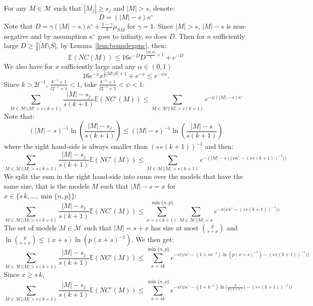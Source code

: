 \documentclass[aos]{imsart}
\theoremstyle{plain}
\newcommand{\E}{\mathbb{E}}
\begin{document}
\begin{supplement}
For any $M \in \mathcal{M}$ such that $|M_j| \geq s_j$ and $|M| > s$, denote:
$$D=\left(|M|-s\right)\kappa^{\circ}$$
Note that $D=\gamma\left(|M|-s\right)\kappa^{\circ} + \tfrac{1-\gamma}{8} \mu_{SM}$ for $\gamma=1$. Since $|M|> s$, $|M|-s$ is non-negative and by assumption $\kappa^{\circ}$ goes to infinity, so does $D$. Then for $n$ sufficiently large $D \geq \frac{3}{4}|M\setminus S|$, by Lemma~\ref{lem:boundexpnc}, then:
$$\E(N C(M)) \leq 16 e^{-D} D^{\frac{|M \setminus S|}{2}+1}+e^{-D}$$
We also have for $x$ sufficiently large and any $\alpha \in (0,1)$
\begin{equation}\label{eq:boundexp}
16e^{-x}x^{\tfrac12|M\setminus S|+1}+e^{-x}\leq e^{-\psi x}. 
\end{equation}
Since $k>2l^{-1}$, $\frac{k^{-1}+1}{l2^{-1}+1}<1$, take $\frac{k^{-1}+1}{l2^{-1}+1}< \psi <1 $:
$$\sum_{M \in \mathcal{M} ||M| > s(k+1)}\frac{|M|-s_j}{s(k+1)}\E(NC^{\circ}(M) ) \leq \sum_{M \in \mathcal{M} ||M| > s(k+1)}e^{-\psi \left(|M|-s\right)\kappa^{\circ}}$$
Note that:
$$\left(|M|-s\right)^{-1}\ln(\frac{|M|-s_j}{s(k+1)}) \leq \left(|M|-s\right)^{-1}\ln(\frac{|M|-s}{s(k+1)})$$
where the right hand-side is always smaller than $(s\,e(k+1))^{-1}$ and then:
$$\sum_{M \in \mathcal{M} ||M| > s(k+1)}\frac{|M|-s_j}{s(k+1)}\E(NC^{\circ}(M) ) \leq \sum_{M \in \mathcal{M} ||M| > s(k+1)}e^{-\left(|M|-s\right)\big(\psi \kappa^{\circ}-\left(s\,e(k+1)\right)^{-1})\big)}$$
We split the sum in the right hand-side into sums over the models that have the same size, that is the models $M$ such that $|M|-s= x$ for $x\in\{s\,k,\ldots,\min\{n,p\}\}$:
\begin{equation*}
    \sum_{M \in \mathcal{M} ||M| > s(k+1)}\frac{|M|-s_j}{s(k+1)}\E(NC^{\circ}(M) ) \leq \sum_{x=s(k+1)}^{\min\{n,p\}}\sum_{M \in \mathcal{M} ||M| =x }e^{-x\big(\psi\kappa^{\circ}-\left(s\,e(k+1)\right)^{-1})\big)}
\end{equation*}
The set of models $M \in \mathcal{M}$ such that $|M| =s+x$ has size at most $ {p \choose s+x}$ and $\ln{p \choose s+x}\leq (x+s) \ln(p(x+s)^{-1})$. We then get:
\begin{equation*}
    \sum_{M \in \mathcal{M} ||M| > s(k+1)}\frac{|M|-s_j}{s(k+1)}\E(NC^{\circ}(M) ) \leq \sum_{x=sk}^{\min\{n,p\}}e^{-x\big(\psi \kappa^{\circ}-(1+sx^{-1})\ln(p(x+s)^{-1})-\left(s\,e(k+1)\right)^{-1})\big)}
\end{equation*}
Since $x\geq s\,k$,
\begin{equation*}
\sum_{M \in \mathcal{M} ||M| > s(k+1)}\frac{|M|-
s_j}{s(k+1)}\E(NC^{\circ}(M) ) \leq \sum_{x=sk}^{\min\{n,p\}}e^{-x\big(\psi \kappa^{\circ}-(1+k^{-1})\ln\big(\frac{p}{k(s+1)}\big)-\left(s\,e(k+1)\right)^{-1})\big)}

\end{equation*}
\end{supplement}
\end{document}
